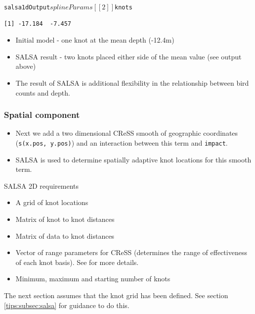 \begin{frame}[fragile]
\begin{knitrout}\footnotesize
{}\color{fgcolor}\begin{kframe}
\begin{alltt}
salsa1dOutput$splineParams[[2]]$knots
\end{alltt}
\begin{verbatim}
[1] -17.184  -7.457
\end{verbatim}
\end{kframe}
\end{knitrout}

\begin{itemize}
\item Initial model - one knot at the mean depth (-12.4m) 
\item SALSA result - two knots placed either side of the mean value (see output above)
\item The result of SALSA is additional flexibility in the relationship between bird counts and depth.
\end{itemize}
\end{frame}

\begin{frame}[fragile]
\frametitle{Spatial component}
\begin{itemize}
\item Next we add a two dimensional CReSS smooth of geographic coordinates ({\tt s(x.pos, y.pos)}) and an interaction between this term and {\tt impact}.
\item SALSA is used to determine spatially adaptive knot locations for this smooth term.
\end{itemize}
\end{frame}

\begin{frame}
\begin{block}{SALSA 2D requirements}
\begin{itemize}
\item A grid of knot locations
\item Matrix of knot to knot distances 
\item Matrix of data to knot distances
\item Vector of range parameters for CReSS (determines the range of effectiveness of each knot basis).  See \citep{ScottH2013} for more details.
\item Minimum, maximum and starting number of knots
\end{itemize}
\end{block}
The next section assumes that the knot grid has been defined. See section \ref{tips:subsec:salsa} for guidance to do this.
\end{frame}

